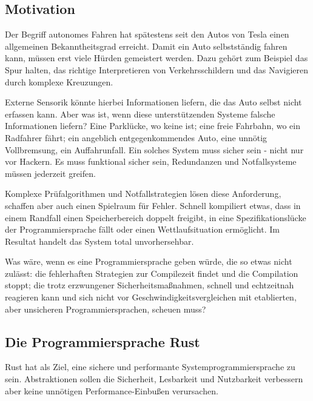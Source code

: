 \begin{multicols}{2}

\subsection*{Motivation}

Der Begriff autonomes Fahren hat spätestens seit den Autos von Tesla einen allgemeinen Bekanntheitsgrad erreicht. Damit ein Auto selbstständig fahren kann, müssen erst viele Hürden gemeistert werden.
Dazu gehört zum Beispiel das Spur halten, das richtige Interpretieren von Verkehrsschildern und das Navigieren durch komplexe Kreuzungen.

Externe Sensorik könnte hierbei Informationen liefern, die das Auto selbst nicht erfassen kann.
Aber was ist, wenn diese unterstützenden Systeme falsche Informationen liefern?
Eine Parklücke, wo keine ist; eine freie Fahrbahn, wo ein Radfahrer fährt; ein angeblich entgegenkommendes Auto, eine unnötig Vollbremsung, ein Auffahrunfall.
Ein solches System muss sicher sein - nicht nur vor Hackern.
Es muss funktional sicher sein, Redundanzen und Notfallsysteme müssen jederzeit greifen.

Komplexe Prüfalgorithmen und Notfallstrategien lösen diese Anforderung, schaffen aber auch einen Spielraum für Fehler.
Schnell kompiliert etwas, dass in einem Randfall einen Speicherbereich doppelt freigibt, in eine Spezifikationslücke der Programmiersprache fällt oder einen Wettlaufsituation ermöglicht.
Im Resultat handelt das System total unvorhersehbar.

Was wäre, wenn es eine Programmiersprache geben würde, die so etwas nicht zulässt: die fehlerhaften Strategien zur Compilezeit findet und die Compilation stoppt; die trotz erzwungener Sicherheitsmaßnahmen, schnell und echtzeitnah reagieren kann und sich nicht vor Geschwindigkeitsvergleichen mit etablierten, aber unsicheren Programmiersprachen, scheuen muss?


\subsection*{Die Programmiersprache Rust}

Rust hat als Ziel, eine sichere und performante Systemprogrammiersprache zu sein.
Abstraktionen sollen die Sicherheit, Lesbarkeit und Nutzbarkeit verbessern aber keine unnötigen Performance-Einbußen verursachen.


\end{multicols}

